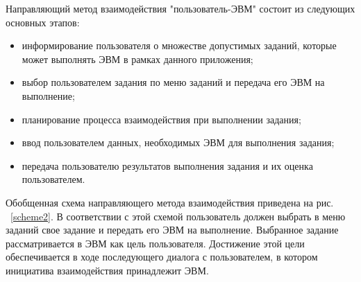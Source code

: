 	Направляющий метод взаимодействия "пользователь-ЭВМ" состоит из следующих основных этапов:
\begin{itemize}
	\item информирование пользователя о множестве допустимых заданий, которые может выполнять ЭВМ в рамках данного приложения;
	\item выбор пользователем задания по меню заданий и передача его ЭВМ на выполнение;
	\item планирование процесса взаимодействия при выполнении задания;
	\item ввод пользователем данных, необходимых ЭВМ для выполнения задания;
	\item передача пользователю результатов выполнения задания и их оценка пользователем. 
\end{itemize}

Обобщенная схема направляющего метода взаимодействия приведена на рис. ~\ref{scheme2}. В соответствии с этой схемой пользователь должен выбрать в меню заданий свое задание и передать его ЭВМ на выполнение. Выбранное задание рассматривается в ЭВМ как цель пользователя. Достижение этой цели обеспечивается в ходе последующего диалога с пользователем, в котором инициатива взаимодействия принадлежит ЭВМ.

